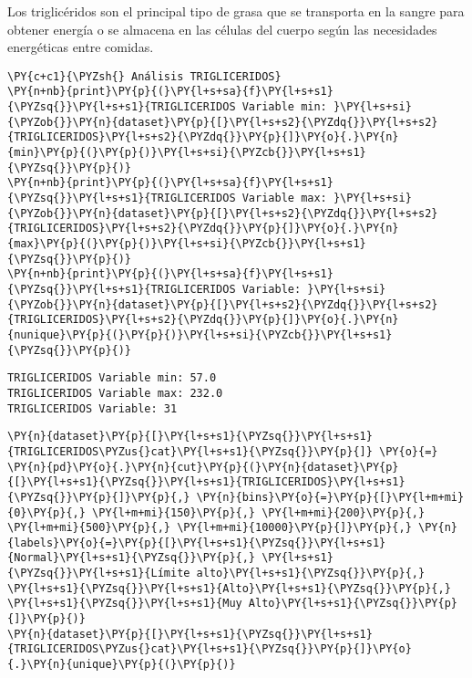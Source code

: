 Los triglicéridos son el principal tipo de grasa que se transporta en la
sangre para obtener energía o se almacena en las células del cuerpo
según las necesidades energéticas entre comidas.

    \begin{tcolorbox}[breakable, size=fbox, boxrule=1pt, pad at break*=1mm,colback=cellbackground, colframe=cellborder]
\begin{Verbatim}[commandchars=\\\{\}]
\PY{c+c1}{\PYZsh{} Análisis TRIGLICERIDOS}
\PY{n+nb}{print}\PY{p}{(}\PY{l+s+sa}{f}\PY{l+s+s1}{\PYZsq{}}\PY{l+s+s1}{TRIGLICERIDOS Variable min: }\PY{l+s+si}{\PYZob{}}\PY{n}{dataset}\PY{p}{[}\PY{l+s+s2}{\PYZdq{}}\PY{l+s+s2}{TRIGLICERIDOS}\PY{l+s+s2}{\PYZdq{}}\PY{p}{]}\PY{o}{.}\PY{n}{min}\PY{p}{(}\PY{p}{)}\PY{l+s+si}{\PYZcb{}}\PY{l+s+s1}{\PYZsq{}}\PY{p}{)}
\PY{n+nb}{print}\PY{p}{(}\PY{l+s+sa}{f}\PY{l+s+s1}{\PYZsq{}}\PY{l+s+s1}{TRIGLICERIDOS Variable max: }\PY{l+s+si}{\PYZob{}}\PY{n}{dataset}\PY{p}{[}\PY{l+s+s2}{\PYZdq{}}\PY{l+s+s2}{TRIGLICERIDOS}\PY{l+s+s2}{\PYZdq{}}\PY{p}{]}\PY{o}{.}\PY{n}{max}\PY{p}{(}\PY{p}{)}\PY{l+s+si}{\PYZcb{}}\PY{l+s+s1}{\PYZsq{}}\PY{p}{)}
\PY{n+nb}{print}\PY{p}{(}\PY{l+s+sa}{f}\PY{l+s+s1}{\PYZsq{}}\PY{l+s+s1}{TRIGLICERIDOS Variable: }\PY{l+s+si}{\PYZob{}}\PY{n}{dataset}\PY{p}{[}\PY{l+s+s2}{\PYZdq{}}\PY{l+s+s2}{TRIGLICERIDOS}\PY{l+s+s2}{\PYZdq{}}\PY{p}{]}\PY{o}{.}\PY{n}{nunique}\PY{p}{(}\PY{p}{)}\PY{l+s+si}{\PYZcb{}}\PY{l+s+s1}{\PYZsq{}}\PY{p}{)}
\end{Verbatim}
\end{tcolorbox}

    \begin{Verbatim}[commandchars=\\\{\}]
TRIGLICERIDOS Variable min: 57.0
TRIGLICERIDOS Variable max: 232.0
TRIGLICERIDOS Variable: 31
    \end{Verbatim}

    \begin{tcolorbox}[breakable, size=fbox, boxrule=1pt, pad at break*=1mm,colback=cellbackground, colframe=cellborder]
\begin{Verbatim}[commandchars=\\\{\}]
\PY{n}{dataset}\PY{p}{[}\PY{l+s+s1}{\PYZsq{}}\PY{l+s+s1}{TRIGLICERIDOS\PYZus{}cat}\PY{l+s+s1}{\PYZsq{}}\PY{p}{]} \PY{o}{=} \PY{n}{pd}\PY{o}{.}\PY{n}{cut}\PY{p}{(}\PY{n}{dataset}\PY{p}{[}\PY{l+s+s1}{\PYZsq{}}\PY{l+s+s1}{TRIGLICERIDOS}\PY{l+s+s1}{\PYZsq{}}\PY{p}{]}\PY{p}{,} \PY{n}{bins}\PY{o}{=}\PY{p}{[}\PY{l+m+mi}{0}\PY{p}{,} \PY{l+m+mi}{150}\PY{p}{,} \PY{l+m+mi}{200}\PY{p}{,} \PY{l+m+mi}{500}\PY{p}{,} \PY{l+m+mi}{10000}\PY{p}{]}\PY{p}{,} \PY{n}{labels}\PY{o}{=}\PY{p}{[}\PY{l+s+s1}{\PYZsq{}}\PY{l+s+s1}{Normal}\PY{l+s+s1}{\PYZsq{}}\PY{p}{,} \PY{l+s+s1}{\PYZsq{}}\PY{l+s+s1}{Límite alto}\PY{l+s+s1}{\PYZsq{}}\PY{p}{,} \PY{l+s+s1}{\PYZsq{}}\PY{l+s+s1}{Alto}\PY{l+s+s1}{\PYZsq{}}\PY{p}{,} \PY{l+s+s1}{\PYZsq{}}\PY{l+s+s1}{Muy Alto}\PY{l+s+s1}{\PYZsq{}}\PY{p}{]}\PY{p}{)}
\PY{n}{dataset}\PY{p}{[}\PY{l+s+s1}{\PYZsq{}}\PY{l+s+s1}{TRIGLICERIDOS\PYZus{}cat}\PY{l+s+s1}{\PYZsq{}}\PY{p}{]}\PY{o}{.}\PY{n}{unique}\PY{p}{(}\PY{p}{)}
\end{Verbatim}
\end{tcolorbox}

